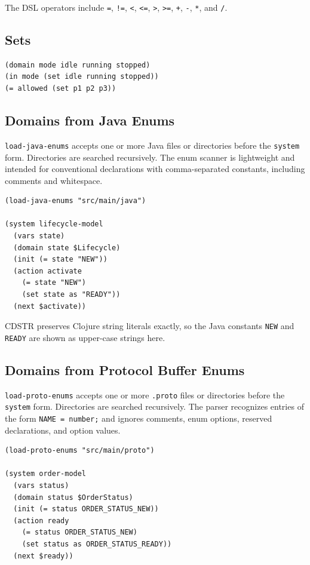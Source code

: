 \documentclass[11pt]{article}
\begin{document}
The DSL operators include \texttt{=}, \texttt{!=}, \texttt{<}, \texttt{<=},
\texttt{>}, \texttt{>=}, \texttt{+}, \texttt{-}, \texttt{*}, and \texttt{/}.

\subsection{Sets}

\begin{lstlisting}[language=CDSTR]
(domain mode idle running stopped)
(in mode (set idle running stopped))
(= allowed (set p1 p2 p3))
\end{lstlisting}

\subsection{Domains from Java Enums}

\texttt{load-java-enums} accepts one or more Java files or directories before
the \texttt{system} form.  Directories are searched recursively.  The enum
scanner is lightweight and intended for conventional declarations with
comma-separated constants, including comments and whitespace.

\begin{lstlisting}[language=CDSTR]
(load-java-enums "src/main/java")

(system lifecycle-model
  (vars state)
  (domain state $Lifecycle)
  (init (= state "NEW"))
  (action activate
    (= state "NEW")
    (set state as "READY"))
  (next $activate))
\end{lstlisting}

CDSTR preserves Clojure string literals exactly, so the Java constants
\texttt{NEW} and \texttt{READY} are shown as upper-case strings here.

\subsection{Domains from Protocol Buffer Enums}

\texttt{load-proto-enums} accepts one or more \texttt{.proto} files or
directories before the \texttt{system} form.  Directories are searched
recursively.  The parser recognizes entries of the form \texttt{NAME = number;}
and ignores comments, enum options, reserved declarations, and option values.

\begin{lstlisting}[language=CDSTR]
(load-proto-enums "src/main/proto")

(system order-model
  (vars status)
  (domain status $OrderStatus)
  (init (= status ORDER_STATUS_NEW))
  (action ready
    (= status ORDER_STATUS_NEW)
    (set status as ORDER_STATUS_READY))
  (next $ready))
\end{lstlisting}
\end{document}

